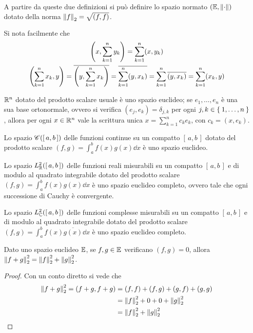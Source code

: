 	A partire da queste due definizioni si può definire lo spazio normato \((\mathbb{E}, \norm{\cdot})\) dotato della norma \(\norm{f}_2 = \sqrt{(f, f)}\).
	
	\begin{osservazione}
		Si nota facilmente che
		\begin{gather*}
			\qty(x, \sum_{k = 1}^n y_k) = \sum_{k = 1}^n (x, y_k) \\
			\qty(\sum_{k = 1}^n x_k, y) = \overline{\qty(y, \sum_{k = 1}^n x_k)} = \overline{\sum_{k = 1}^n (y, x_k)} = \sum_{k = 1}^n \overline{(y, x_k)} = \sum_{k = 1}^n (x_k, y)
		\end{gather*}
	\end{osservazione}	

	\begin{esempio}
		\(\mathbb{R}^n\) dotato del prodotto scalare usuale è uno spazio euclideo; se \(e_1, \dots, e_n\) è una sua base ortonormale, ovvero si verifica \((e_j, e_k) = \delta_{j, k}\) per ogni \(j, k \in \Set{1, \dots, n}\), allora per ogni \(x \in \mathbb{R}^n\) vale la scrittura unica \(x = \sum_{k = 1}^n c_k e_k\), con \(c_k = (x, e_k)\).
		
		Lo spazio \(\mathscr{C} ([\, a, b \,])\) delle funzioni continue su un compatto \([\, a, b \,]\) dotato del prodotto scalare \((f, g) = \int_a^b f (x) g (x) \dd{x}\) è uno spazio euclideo.
		
		Lo spazio \(L_\mathbb{R}^2 ([\, a, b \,])\) delle funzioni reali misurabili su un compatto \([\, a, b \,]\) e di modulo al quadrato integrabile dotato del prodotto scalare \((f, g) = \int_a^b f (x) g (x) \dd{x}\) è uno spazio euclideo completo, ovvero tale che ogni successione di Cauchy è convergente.
		
		Lo spazio \(L_\mathbb{C}^2 ([\, a, b \,])\) delle funzioni complesse misurabili su un compatto \([\, a, b \,]\) e di modulo al quadrato integrabile dotato del prodotto scalare \((f, g) = \int_a^b f (x) \overline{g (x)} \dd{x}\) è uno spazio euclideo completo.
	\end{esempio}
	
	\begin{teorema}[Pitagora]\label{th:pitagora}
		Dato uno spazio euclideo \(\mathbb{E}\), se \(f, g \in \mathbb{E}\) verificano \((f, g) = 0\), allora \(\norm{f + g}_2^2 = \norm{f}_2^2 + \norm{g}_2^2\).
	\end{teorema}
	
	\begin{proof}
		Con un conto diretto si vede che
		\begin{equation*}
			\begin{split}
				\norm{f + g}_2^2 = (f + g, f + g) &= (f, f) + (f, g) + (g, f) + (g, g) \\
				&= \norm{f}_2^2 + 0 + 0 + \norm{g}_2^2 \\
				&= \norm{f}_2^2 + \norm{g}_2^2\qedhere
			\end{split}
		\end{equation*}
	\end{proof}

